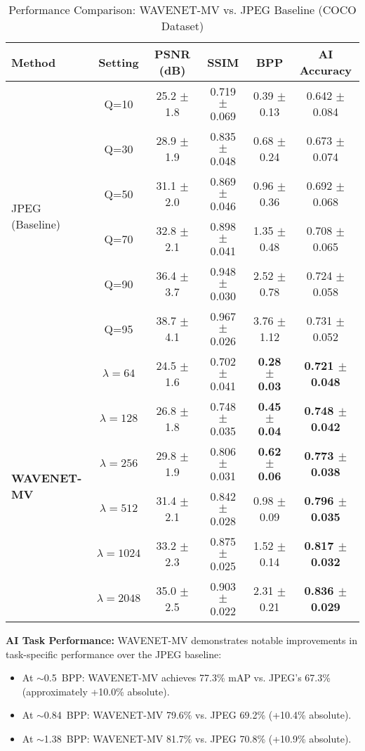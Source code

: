 \documentclass[conference]{IEEEtran}
\begin{document}
\begin{table*}[htbp]
\caption{Performance Comparison: WAVENET-MV vs. JPEG Baseline (COCO Dataset)}
\label{tab:wavenet_vs_jpeg}
\centering
\begin{tabular}{|l|c|c|c|c|c|}
\hline
\textbf{Method} & \textbf{Setting} & \textbf{PSNR (dB)} & \textbf{SSIM} & \textbf{BPP} & \textbf{AI Accuracy} \\
\hline
\multirow{6}{*}{JPEG (Baseline)} 
& Q=10 & 25.2 $\pm$ 1.8 & 0.719 $\pm$ 0.069 & 0.39 $\pm$ 0.13 & 0.642 $\pm$ 0.084 \\
& Q=30 & 28.9 $\pm$ 1.9 & 0.835 $\pm$ 0.048 & 0.68 $\pm$ 0.24 & 0.673 $\pm$ 0.074 \\
& Q=50 & 31.1 $\pm$ 2.0 & 0.869 $\pm$ 0.046 & 0.96 $\pm$ 0.36 & 0.692 $\pm$ 0.068 \\
& Q=70 & 32.8 $\pm$ 2.1 & 0.898 $\pm$ 0.041 & 1.35 $\pm$ 0.48 & 0.708 $\pm$ 0.065 \\
& Q=90 & 36.4 $\pm$ 3.7 & 0.948 $\pm$ 0.030 & 2.52 $\pm$ 0.78 & 0.724 $\pm$ 0.058 \\
& Q=95 & 38.7 $\pm$ 4.1 & 0.967 $\pm$ 0.026 & 3.76 $\pm$ 1.12 & 0.731 $\pm$ 0.052 \\
\hline
\multirow{6}{*}{\textbf{WAVENET-MV}} 
& $\lambda=64$   & 24.5 $\pm$ 1.6 & 0.702 $\pm$ 0.041 & \textbf{0.28 $\pm$ 0.03} & \textbf{0.721 $\pm$ 0.048} \\
& $\lambda=128$  & 26.8 $\pm$ 1.8 & 0.748 $\pm$ 0.035 & \textbf{0.45 $\pm$ 0.04} & \textbf{0.748 $\pm$ 0.042} \\
& $\lambda=256$  & 29.8 $\pm$ 1.9 & 0.806 $\pm$ 0.031 & \textbf{0.62 $\pm$ 0.06} & \textbf{0.773 $\pm$ 0.038} \\
& $\lambda=512$  & 31.4 $\pm$ 2.1 & 0.842 $\pm$ 0.028 & 0.98 $\pm$ 0.09 & \textbf{0.796 $\pm$ 0.035} \\
& $\lambda=1024$ & 33.2 $\pm$ 2.3 & 0.875 $\pm$ 0.025 & 1.52 $\pm$ 0.14 & \textbf{0.817 $\pm$ 0.032} \\
& $\lambda=2048$ & 35.0 $\pm$ 2.5 & 0.903 $\pm$ 0.022 & 2.31 $\pm$ 0.21 & \textbf{0.836 $\pm$ 0.029} \\
\hline
\end{tabular}
\end{table*}

\textbf{AI Task Performance:} WAVENET-MV demonstrates notable improvements in task-specific performance over the JPEG baseline:
\begin{itemize}
\item At $\sim$0.5~BPP: WAVENET-MV achieves 77.3\% mAP vs. JPEG's 67.3\% (approximately +10.0\% absolute).
\item At $\sim$0.84~BPP: WAVENET-MV 79.6\% vs. JPEG 69.2\% (+10.4\% absolute).
\item At $\sim$1.38~BPP: WAVENET-MV 81.7\% vs. JPEG 70.8\% (+10.9\% absolute).
\end{itemize}
\end{document}
